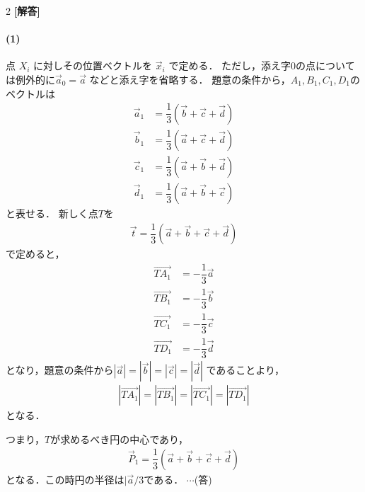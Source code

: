 \documentclass[../../main.tex]{subfiles}
\begin{document}
\setcounter{equation}{0}
\begin{oframed}
  
\end{oframed}
\setlength{\columnseprule}{0.4pt}
\begin{multicols}{2}
  {\bf [解答]}
  \paragraph{(1)}
  点 $X_i$ に対しその位置ベクトルを $\vec{x}_i$ で定める．
  ただし，添え字$0$の点については例外的に$\vec{a}_0 = \vec{a}$ などと添え字を省略する．
  題意の条件から，$A_1,B_1,C_1,D_1$のベクトルは
  \begin{align}
    \vec{a}_1 & = \dfrac{1}{3} (\vec{b} + \vec{c} + \vec{d}) \\
    \vec{b}_1 & = \dfrac{1}{3} (\vec{a} + \vec{c} + \vec{d}) \\
    \vec{c}_1 & = \dfrac{1}{3} (\vec{a} + \vec{b} + \vec{d}) \\
    \vec{d}_1 & = \dfrac{1}{3} (\vec{a} + \vec{b} + \vec{c})
  \end{align}
  と表せる．
  新しく点$T$を
  \begin{align}
    \vec{t} = \dfrac{1}{3} \left(\vec{a} + \vec{b} + \vec{c} + \vec{d}\right) \label{eq:1}
  \end{align}
  で定めると，
  \begin{align}
    \overrightarrow{TA_1} & = -\dfrac{1}{3}\vec{a} \\
    \overrightarrow{TB_1} & = -\dfrac{1}{3}\vec{b} \\
    \overrightarrow{TC_1} & = -\dfrac{1}{3}\vec{c} \\
    \overrightarrow{TD_1} & = -\dfrac{1}{3}\vec{d}
  \end{align}
  となり，題意の条件から$|\vec{a}| = |\vec{b}| = |\vec{c}| = |\vec{d}|$ であることより，
  \begin{align}
    |\overrightarrow{TA_1}| = |\overrightarrow{TB_1}| = |\overrightarrow{TC_1}| = |\overrightarrow{TD_1}|
  \end{align}
  となる．

  つまり，$T$が求めるべき円の中心であり，
  \begin{align}
    \vec{P}_1 = \dfrac{1}{3}\left(\vec{a} + \vec{b} + \vec{c} + \vec{d}\right)
  \end{align}
  となる．この時円の半径は$|\vec{a}/3$である． $\cdots$(答)


\end{multicols}
\end{document}
